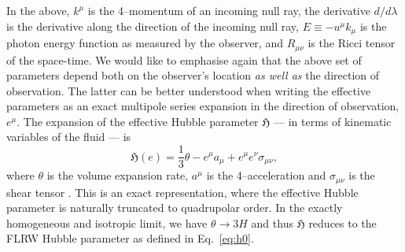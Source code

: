 \documentclass[fleqn,usenatbib]{mnras}
\begin{document}
In the above, $k^\mu$ is the 4--momentum of an incoming null ray, the derivative  ${d}/{d\lambda}$ is the derivative along the direction of the incoming null ray, {$E\equiv -u^\mu k_\mu$} is the photon energy function as measured by the observer, and $R_{\mu\nu}$ is the Ricci tensor
of the space-time. We would like to emphasise again that the above set of parameters depend both on the observer's location \textit{as well as} the direction of observation. 
{The latter can be better understood when writing} the effective parameters as an exact multipole {series} expansion in the direction of observation, $e^\mu$.
The expansion of the effective Hubble parameter $\mathfrak{H}$ {---} in terms of
kinematic variables of the fluid {---} is  
\begin{equation}
\mathfrak{H}(e) = \frac{1}{3}\theta - e^{\mu}a_{\mu}+e^{\mu}e^{\nu}\sigma_{\mu\nu},
\label{eq:effective hubble_multipole_expansion}
\end{equation}
where $\theta$ is the volume expansion rate, $a^\mu$ is the 4--acceleration and $\sigma_{\mu\nu}$ is the shear tensor {\citep[see, e.g.][for definitions of these fluid quantities]{Heinesen_2021}}. This is an exact representation, where the effective Hubble parameter is naturally truncated to quadrupolar order{. In the exactly} homogeneous and isotropic limit, {we have $\theta\rightarrow 3H$ and thus $\mathfrak{H}$} %
reduces to the FLRW Hubble parameter as defined in Eq.~\eqref{eq:h0}. 
\end{document}
